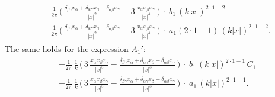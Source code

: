 \begin{align}
\begin{alignedat}{1}
  &- \frac{1}{2\pi} \, \bigg(\, \frac{\delta_{\beta\gamma} x_\alpha + \delta_{\alpha \gamma} x_\beta + \delta_{\alpha \beta} x_\gamma}{|x|^2} - 3\, \frac{x_\alpha x_\beta x_\gamma}{|x|^4} \, \bigg) 
    \,\cdot \; b_1 \, (k|x|)^{2 \cdot 1 - 2}  \\[1.0em]
  &- \frac{1}{2\pi} \, \bigg(\,\frac{\delta_{\beta\gamma} x_\alpha + \delta_{\alpha \gamma} x_\beta + \delta_{\alpha \beta} x_\gamma}{|x|^2} - 3\, \frac{x_\alpha x_\beta x_\gamma}{|x|^4} \, \bigg) 
  \,\cdot \; a_1 (2 \cdot 1 - 1) \, (k|x|)^{2 \cdot 1 - 2} .
  \end{alignedat}
\end{align}
The same holds for the expression $A_1'$:
\begin{align}
  \label{eq:Q4}
  \tag{Q4}
  \begin{alignedat}{1}
    &- \frac{1}{2\pi} \, \frac{1}{k} \, \bigg(\, 3\, \frac{x_\alpha x_\beta x_\gamma}{|x|^5} - \frac{\delta_{\beta\gamma} x_\alpha + \delta_{\alpha\gamma} x_\beta + \delta_{\alpha\beta} x_\gamma}{|x|^3} \, \bigg)  
    \,\cdot \; b_1 \, (k|x|)^{2 \cdot 1 - 1} \, C_1  \\[1.0em]
    &- \frac{1}{2\pi} \, \frac{1}{k} \, \bigg( \, 3\, \frac{x_\alpha x_\beta x_\gamma}{|x|^5} - \frac{\delta_{\beta\gamma} x_\alpha + \delta_{\alpha\gamma} x_\beta + \delta_{\alpha\beta} x_\gamma}{|x|^3} \, \bigg)  
  \,\cdot \; a_1 \, (k|x|)^{2 \cdot 1 - 1} .
  \end{alignedat}
\end{align}
